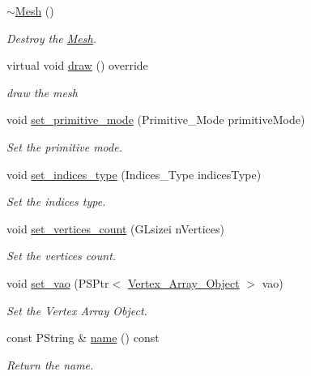 \begin{DoxyCompactItemize}
\mbox{\hyperlink{classprz_1_1_mesh_a1f550ea9ea4e04fcc24722843b44419f}{$\sim$\+Mesh}} ()
\begin{DoxyCompactList}\small\item\em Destroy the \mbox{\hyperlink{classprz_1_1_mesh}{Mesh}}. \end{DoxyCompactList}\item 
virtual void \mbox{\hyperlink{classprz_1_1_mesh_aed5a3cd6605bc59e29d6957a8f1a1131}{draw}} () override
\begin{DoxyCompactList}\small\item\em draw the mesh \end{DoxyCompactList}\item 
void \mbox{\hyperlink{classprz_1_1_mesh_a909e0d3a9a3670425b6215546b572b1c}{set\+\_\+primitive\+\_\+mode}} (Primitive\+\_\+\+Mode primitive\+Mode)
\begin{DoxyCompactList}\small\item\em Set the primitive mode. \end{DoxyCompactList}\item 
void \mbox{\hyperlink{classprz_1_1_mesh_aef8f3ed8273c53307cd7633564c15dd2}{set\+\_\+indices\+\_\+type}} (Indices\+\_\+\+Type indices\+Type)
\begin{DoxyCompactList}\small\item\em Set the indices type. \end{DoxyCompactList}\item 
void \mbox{\hyperlink{classprz_1_1_mesh_adc1085f2b12d870bc1ce3c2378d6e25e}{set\+\_\+vertices\+\_\+count}} (G\+Lsizei n\+Vertices)
\begin{DoxyCompactList}\small\item\em Set the vertices count. \end{DoxyCompactList}\item 
void \mbox{\hyperlink{classprz_1_1_mesh_a8d66563903c78c841d6019da34ef368b}{set\+\_\+vao}} (P\+S\+Ptr$<$ \mbox{\hyperlink{classprz_1_1_vertex___array___object}{Vertex\+\_\+\+Array\+\_\+\+Object}} $>$ vao)
\begin{DoxyCompactList}\small\item\em Set the Vertex Array Object. \end{DoxyCompactList}\item 
const P\+String \& \mbox{\hyperlink{classprz_1_1_mesh_ae2a7cec3a1cb7409ea2017cd729fe683}{name}} () const
\begin{DoxyCompactList}\small\item\em Return the name. \end{DoxyCompactList}\end{DoxyCompactItemize}
